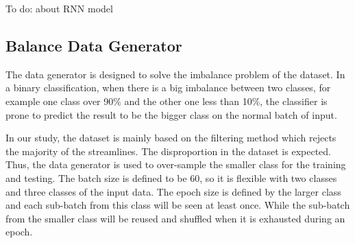 To do: about RNN model

\subsection{Balance Data Generator}

The data generator is designed to solve the imbalance problem of the dataset. In a binary classification, 
when there is a big imbalance between two classes, for example one class over 90\% and the other one less than 10\%,
the classifier is prone to predict the result to be the bigger class on the normal batch of input. 

In our study, the dataset is mainly based on the filtering method which rejects the majority of the streamlines. 
The disproportion in the dataset is expected. Thus, the data generator is used to over-sample the smaller class for the training and testing.
The batch size is defined to be 60, so it is flexible with two classes and three classes of the input data. 
The epoch size is defined by the larger class and each sub-batch from this class will be seen at least once.
While the sub-batch from the smaller class will be reused and shuffled when it is exhausted during an epoch.









